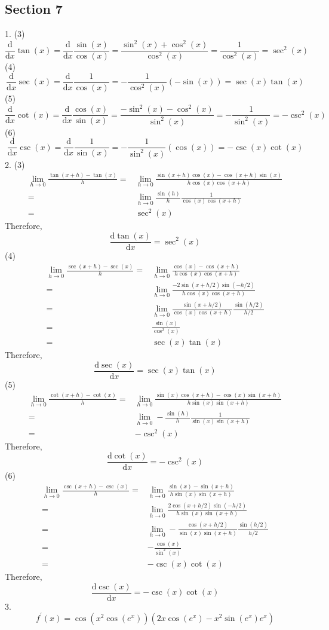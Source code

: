\subsection{Section 7}
1. (3)
$$\frac{\mathrm d}{\mathrm dx}\tan(x)=\frac{\mathrm d}{\mathrm dx}\frac{\sin(x)}{\cos(x)}=\frac{\sin^2(x)+\cos^2(x)}{\cos^2(x)}=\frac{1}{\cos^2(x)}=\sec^2(x)$$
(4)
$$\frac{\mathrm d}{\mathrm dx}\sec(x)=\frac{\mathrm d}{\mathrm dx}\frac{1}{\cos(x)}=-\frac{1}{\cos^2(x)}(-\sin(x))=\sec(x)\tan(x)$$
(5)
$$\frac{\mathrm d}{\mathrm dx}\cot(x)=\frac{\mathrm d}{\mathrm dx}\frac{\cos(x)}{\sin(x)}=\frac{-\sin^2(x)-\cos^2(x)}{\sin^2(x)}=-\frac{1}{\sin^2(x)}=-\csc^2(x)$$
(6)
$$\frac{\mathrm d}{\mathrm dx}\csc(x)=\frac{\mathrm d}{\mathrm dx}\frac{1}{\sin(x)}=-\frac{1}{\sin^2(x)}(\cos(x))=-\csc(x)\cot(x)$$
2. (3)
\begin{align*}
    \lim_{h\to0}\frac{\tan(x+h)-\tan(x)}{h}
    =&\lim_{h\to0}\frac{\sin(x+h)\cos(x)-\cos(x+h)\sin(x)}{h\cos(x)\cos(x+h)}\\
    =&\lim_{h\to0}\frac{\sin(h)}{h}\frac{1}{\cos(x)\cos(x+h)}\\
    =&\sec^2(x)
\end{align*}
Therefore,
$$\frac{\mathrm d\tan(x)}{\mathrm dx}=\sec^2(x)$$
(4)
\begin{align*}
    \lim_{h\to0}\frac{\sec(x+h)-\sec(x)}{h}
    =&\lim_{h\to0}\frac{\cos(x)-\cos(x+h)}{h\cos(x)\cos(x+h)}\\
    =&\lim_{h\to0}\frac{-2\sin(x+h/2)\sin(-h/2)}{h\cos(x)\cos(x+h)}\\
    =&\lim_{h\to0}\frac{\sin(x+h/2)}{\cos(x)\cos(x+h)}\frac{\sin(h/2)}{h/2}\\
    =&\frac{\sin(x)}{\cos^2(x)}\\
    =&\sec(x)\tan(x)
\end{align*}
Therefore,
$$\frac{\mathrm d\sec(x)}{\mathrm dx}=\sec(x)\tan(x)$$
(5)
\begin{align*}
    \lim_{h\to0}\frac{\cot(x+h)-\cot(x)}{h}
    =&\lim_{h\to0}\frac{\sin(x)\cos(x+h)-\cos(x)\sin(x+h)}{h\sin(x)\sin(x+h)}\\
    =&\lim_{h\to0}-\frac{\sin(h)}{h}\frac{1}{\sin(x)\sin(x+h)}\\
    =&-\csc^2(x)
\end{align*}
Therefore,
$$\frac{\mathrm d\cot(x)}{\mathrm dx}=-\csc^2(x)$$
(6)
\begin{align*}
    \lim_{h\to0}\frac{\csc(x+h)-\csc(x)}{h}
    =&\lim_{h\to0}\frac{\sin(x)-\sin(x+h)}{h\sin(x)\sin(x+h)}\\
    =&\lim_{h\to0}\frac{2\cos(x+h/2)\sin(-h/2)}{h\sin(x)\sin(x+h)}\\
    =&\lim_{h\to0}-\frac{\cos(x+h/2)}{\sin(x)\sin(x+h)}\frac{\sin(h/2)}{h/2}\\
    =&-\frac{\cos(x)}{\sin^2(x)}\\
    =&-\csc(x)\cot(x)
\end{align*}
Therefore,
$$\frac{\mathrm d\csc(x)}{\mathrm dx}=-\csc(x)\cot(x)$$
3.
$$f^\prime(x)=\cos(x^2\cos(e^x))(2x\cos(e^x)-x^2\sin(e^x)e^x)$$

